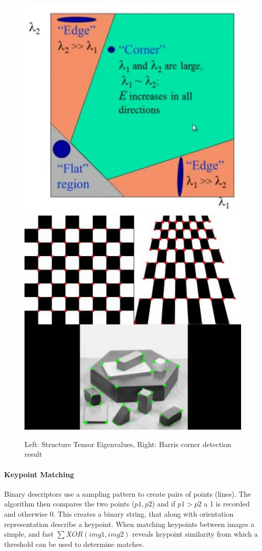 \documentclass[11pt,twoside]{report}
\begin{document}
\noindent \begin{figure}[h!] 
	\includegraphics[width = 0.5\hsize]{figures/harris_region.jpg}
	\includegraphics[width = 0.45\hsize]{figures/harris_result.jpg}
	\caption{Left: Structure Tensor Eigenvalues, Right: Harris corner detection result \cite{opencv_harris_article} }
	\label{Harris}
\end{figure}

\paragraph{Keypoint Matching}
Binary descriptors use a sampling pattern to create pairs of points (lines). The algorithm then compares the two points ($p1,p2$) and if $p1 > p2$ a 1 is recorded and otherwise 0. This creates a binary string, that along with orientation representation describe a keypoint. When matching keypoints between images a simple, and fast $\sum XOR(img1,img2)$ reveals keypoint similarity from which a threshold can be used to determine matches.
\end{document}
